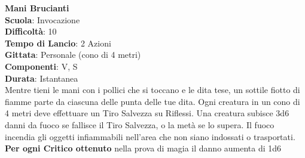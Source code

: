 \begin{multicols}{2}
\medskip\textbf{Mani Brucianti}\\
\textbf{Scuola}: Invocazione\\
\textbf{Difficoltà}: 10\\
\textbf{Tempo di Lancio}: 2 Azioni\\
\textbf{Gittata}: Personale (cono di 4 metri)\\
\textbf{Componenti}: V, S\\
\textbf{Durata}: Istantanea\\
Mentre tieni le mani con i pollici che si toccano e le dita tese, un sottile fiotto di fiamme parte da ciascuna delle punta delle tue dita. Ogni creatura in un cono di 4 metri deve effettuare un Tiro Salvezza su Riflessi. Una creatura subisce 3d6 danni da fuoco se fallisce il Tiro Salvezza, o la metà se lo supera. Il fuoco incendia gli oggetti infiammabili nell'area che non siano indossati o trasportati.\\
\textbf{Per ogni Critico ottenuto} nella prova di magia il danno aumenta di 1d6


\end{multicols}
